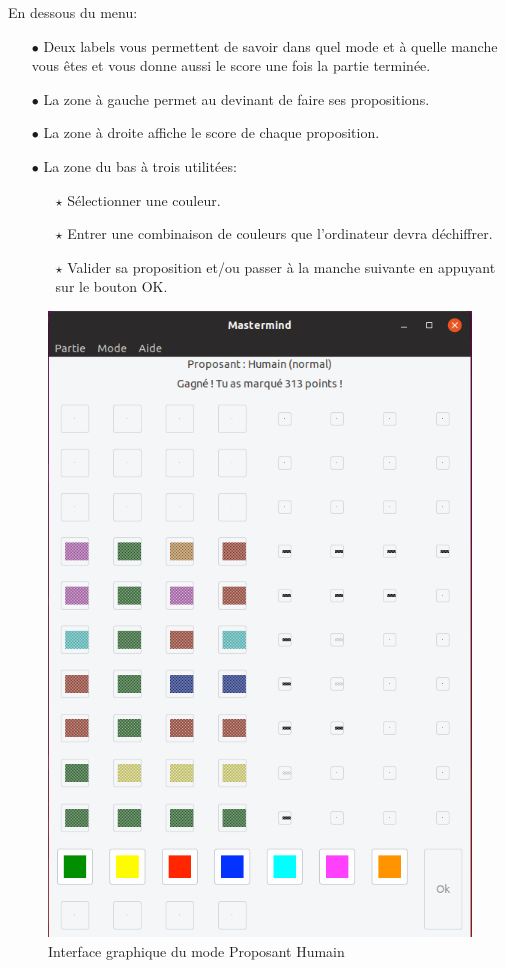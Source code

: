 \documentclass[a4paper, 11pt, oneside]{article}
\begin{document}
En dessous du menu: 
\begin{itemize}
    \item[$\bullet$] Deux labels vous permettent de savoir dans quel mode et à quelle manche vous êtes et vous donne aussi le score une fois la partie terminée.
    \item[$\bullet$] La zone à gauche permet au devinant de faire ses propositions.
    \item[$\bullet$] La zone à droite affiche le score de chaque proposition.
    \item[$\bullet$] La zone du bas à trois utilitées:
        \begin{itemize}
            \item[$\star$] Sélectionner une couleur.
            \item[$\star$] Entrer une combinaison de couleurs que l'ordinateur devra déchiffrer.
            \item[$\star$] Valider sa proposition et/ou passer à la manche suivante en appuyant sur le bouton OK.
        \end{itemize}
\end{itemize}

\begin{figure}[H]
    \center
        \includegraphics[scale=0.3]{images_rapport/proposanthumain.png}  
        \caption{Interface graphique du mode Proposant Humain}
\end{figure}
\end{document}
